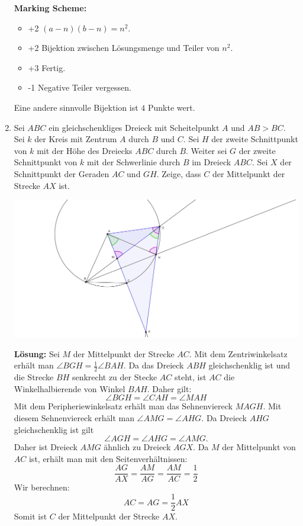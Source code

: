 \documentclass[language=german,style=solution]{smo}
\begin{document}
\begin{enumerate}[label=\textbf{\arabic*.}]
\textbf{Marking Scheme:}
\begin{itemize}
	\item +2 $(a-n)(b-n) = n^2$.
	\item +2 Bijektion zwischen Lösungsmenge und Teiler von $n^2$.
	\item +3 Fertig.
	\item -1 Negative Teiler vergessen.
\end{itemize}
Eine andere sinnvolle Bijektion ist $4$ Punkte wert.

\newpage

\item Sei $ABC$ ein gleichschenkliges Dreieck mit Scheitelpunkt $A$ und $AB > BC$. Sei $k$ der Kreis mit Zentrum $A$ durch $B$ und $C$. Sei $H$ der zweite Schnittpunkt von $k$ mit der Höhe des Dreiecks $ABC$ durch $B$. Weiter sei $G$ der zweite Schnittpunkt von $k$ mit der Schwerlinie durch $B$ im Dreieck $ABC$. Sei $X$ der Schnittpunkt der Geraden $AC$ und $GH$. Zeige, dass $C$ der Mittelpunkt der Strecke $AX$ ist.

\includegraphics[width=\textwidth]{finalrunde_8_2017.png}

\textbf{Lösung:}
Sei $M$ der Mittelpunkt der Strecke $AC$. Mit dem Zentriwinkelsatz erhält man $\angle BGH=\frac{1}{2}\angle BAH$. Da das Dreieck $ABH$ gleichschenklig ist und die Strecke $BH$ senkrecht zu der Stecke $AC$ steht, ist $AC$ die Winkelhalbierende von Winkel $BAH$. Daher gilt:
\[
\angle BGH = \angle CAH = \angle MAH
\]
Mit dem Peripheriewinkelsatz erhält man das Sehnenviereck $MAGH$. Mit diesem Sehnenviereck erhält man $\angle AMG=\angle AHG$. Da Dreieck $AHG$ gleichschenklig ist gilt
\[
\angle AGH=\angle AHG=\angle AMG.
\]
Daher ist Dreieck $AMG$ ähnlich zu Dreieck $AGX$. Da $M$ der Mittelpunkt von $AC$ ist, erhält man mit den Seitenverhältnissen:
\[
\frac{AG}{AX}=\frac{AM}{AG}=\frac{AM}{AC}=\frac{1}{2}
\]
Wir berechnen:
\[
AC = AG = \frac{1}{2} AX
\]
Somit ist $C$ der Mittelpunkt der Strecke $AX$.


\end{enumerate}
\end{document}
